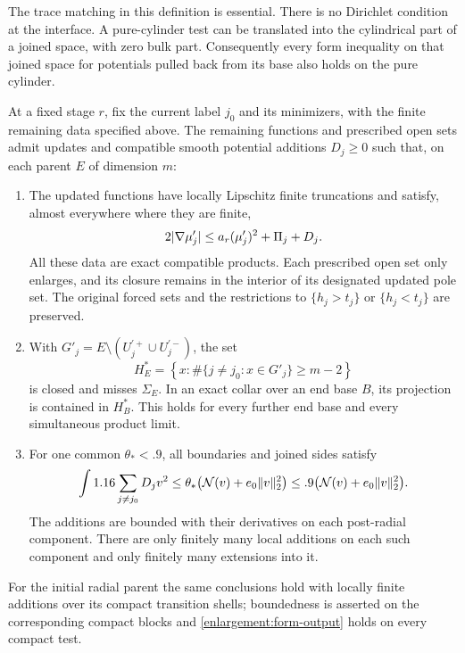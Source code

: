The trace matching in this definition is essential.  There is no
Dirichlet condition at the interface.  A pure-cylinder test can be translated
into the cylindrical part of a joined space, with zero bulk part.
Consequently every form inequality on that joined space for potentials
pulled back from its base also holds on the pure cylinder.

\begin{proposition}\label{enlargement:global}
At a fixed stage $r$, fix the current label $j_0$ and its minimizers, with the finite remaining data specified above. The
remaining functions and prescribed open sets admit updates and compatible smooth
potential additions $D_j\ge0$ such that, on each parent $E$ of
dimension $m$:
\begin{enumerate}[label=\textup{(\roman*)}]
\item The updated functions have locally Lipschitz finite truncations
and satisfy, almost everywhere where they are finite,
\begin{equation}\label{enlargement:function-output}
 2\lvert\nabla\mu'_j\rvert\le a_r(\mu'_j)^2+\Pi_j+D_j.
\end{equation}
All these data are exact compatible products.  Each prescribed open set only enlarges,
and its closure remains in the interior of its designated updated pole
set.  The original forced sets and the restrictions to $\{h_j>t_j\}$ or $\{h_j<t_j\}$ are
preserved.
\item With $G'_j=E\setminus(U_j^{\prime+}\cup U_j^{\prime-})$, the set
\begin{equation}\label{enlargement:count-set-output}
 H_E^*=\left\{x:\#\{j\ne j_0:x\in G'_j\}\ge m-2\right\}
\end{equation}
is closed and misses $\Sigma_E$.  In an exact collar over an end base $B$,
its projection is contained in $H_B^*$.  This holds for every further
end base and every simultaneous product limit.
\item For one common $\theta_*<.9$, all boundaries and joined sides satisfy
\begin{equation}\label{enlargement:form-output}
 \int 1.16\sum_{j\ne j_0}D_jv^2
 \le\theta_*\bigl(\mathcal N(v)+e_0\lVert v\rVert_2^2\bigr)
 \le .9\bigl(\mathcal N(v)+e_0\lVert v\rVert_2^2\bigr).
\end{equation}
The additions are bounded with their derivatives on each post-radial
component.  There are only finitely many local additions on each such
component and only finitely many extensions into it.
\end{enumerate}
For the initial radial parent the same conclusions hold with locally
finite additions over its compact transition shells; boundedness is
asserted on the corresponding compact blocks and
\cref{enlargement:form-output} holds on every compact test.
\end{proposition}

